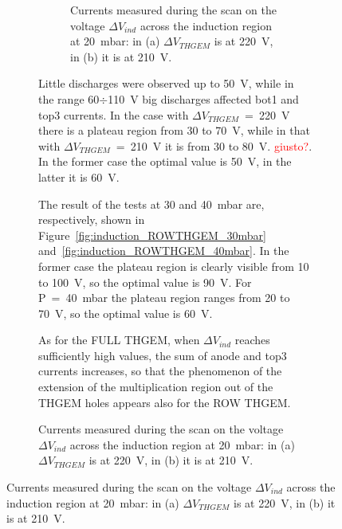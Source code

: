 \documentclass[a4paper, 11 pt]{article}
\newcommand{\Vind}{$\Delta V_{ind}$}
\newcommand{\Vthgem}{$\Delta V_{THGEM}$}
\begin{document}
\begin{figure}[htbp]
\begin{figure}[htbp]
\begin{figure}[!htb]
	\caption{Currents measured during the scan on the voltage \Vind{} across the induction region at 20~mbar: in (a) \Vthgem{} is at 220~V, in (b) it is at 210~V.}
	\label{fig:induction_ROWTHGEM_20mbar_both}
\end{figure}
Little discharges were observed up to 50~V, while in the range 60$\div$110~V big discharges affected bot1 and top3 currents.
In the case with \Vthgem~=~220~V there is a plateau region from 30 to 70~V, while in that with \Vthgem~=~210~V it is from 30 to 80~V.
\textcolor{red}{giusto?}.
In the former case the optimal value is 50~V, in the latter it is 60~V.



The result of the tests at 30 and 40~mbar are, respectively, shown in Figure~\ref{fig:induction_ROWTHGEM_30mbar} and~\ref{fig:induction_ROWTHGEM_40mbar}.
In the former case the plateau region is clearly visible from 10 to 100~V, so the optimal value is 90~V.
For P~=~40~mbar the plateau region ranges from 20 to 70~V, so the optimal value is 60~V.

As for the FULL THGEM, when \Vind{} reaches sufficiently high values, the sum of anode and top3 currents increases, so that the phenomenon of the extension of the multiplication region out of the THGEM holes appears also for the ROW THGEM.


\end{figure}
\end{figure}
\end{document}
